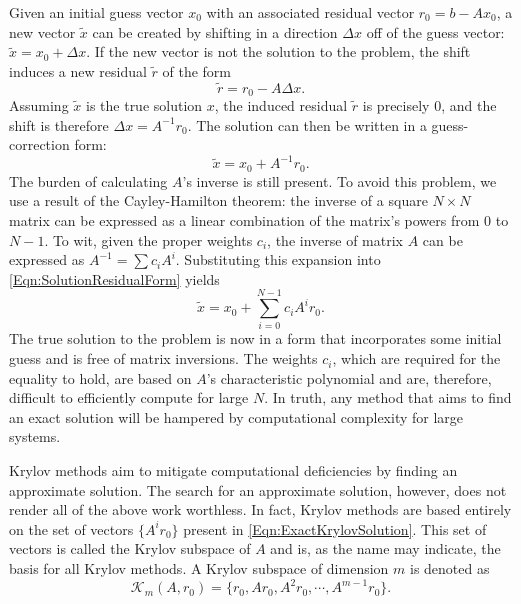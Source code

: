 \documentclass[Prelim,12pt]{WisconsinThesis}
\newcommand{\by}    {\!\times\!}
\newcommand{\dx}    {\ensuremath{\Delta{x}}}
\begin{document}
Given an initial guess vector $x_0$ with an associated residual vector $r_0 = b - A x_0$, a new vector $\tilde{x}$ can be created by shifting in a direction \dx{} off of the guess vector: $\tilde{x} = x_0 + \dx$.
If the new vector is not the solution to the problem, the shift induces a new residual $\tilde{r}$ of the form
\begin{equation}
    \tilde{r} = r_0  - A \dx.
    \label{Eqn:ResidualUpdateForm}
\end{equation}
Assuming $\tilde{x}$ is the true solution $x$, the induced residual $\tilde{r}$ is precisely $0$, and the shift is therefore $\dx = A^{-1}r_0$.
The solution can then be written in a guess-correction form:
\begin{equation}
    \tilde{x} = x_0 + A^{-1}r_0.
    \label{Eqn:SolutionResidualForm}
\end{equation}
The burden of calculating $A$'s inverse is still present.
To avoid this problem, we use a result of the Cayley-Hamilton theorem: the inverse of a square $N \by N$ matrix can be expressed as a linear combination of the matrix's powers from $0$ to $N-1$.
To wit, given the proper weights $c_i$, the inverse of matrix $A$ can be expressed as $A^{-1} = \sum c_i A^i$.
Substituting this expansion into \cref{Eqn:SolutionResidualForm} yields
\begin{equation}
    \tilde{x} = x_0 + \sum_{i = 0}^{N-1} c_i A^i r_0.
    \label{Eqn:ExactKrylovSolution}
\end{equation}
The true solution to the problem is now in a form that incorporates some initial guess and is free of matrix inversions.
The weights $c_i$, which are required for the equality to hold, are based on $A$'s characteristic polynomial and are, therefore, difficult to efficiently compute for large $N$.
In truth, any method that aims to find an exact solution will be hampered by computational complexity for large systems.


Krylov methods aim to mitigate computational deficiencies by finding an approximate solution.
The search for an approximate solution, however, does not render all of the above work worthless.
In fact, Krylov methods are based entirely on the set of vectors $\{A^i r_0\}$ present in \cref{Eqn:ExactKrylovSolution}.
This set of vectors is called the Krylov subspace of $A$ and is, as the name may indicate, the basis for all Krylov methods.
A Krylov subspace of dimension $m$ is denoted as 
\begin{equation}
    \mathcal{K}_m(A,r_0) = \{r_0 , A r_0 , A^2 r_0,\cdots,A^{m-1} r_0\}.
\end{equation}
\end{document}
